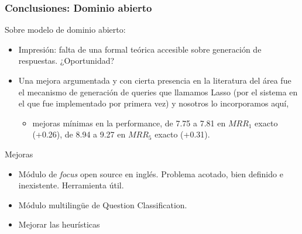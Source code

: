 \begin{frame}
\frametitle{Conclusiones: Dominio abierto}

Sobre modelo de dominio abierto:
  \begin{itemize}
 \item Impresión: falta de una  formal teórica accesible sobre generación de respuestas. ¿Oportunidad?
 \item Una mejora argumentada y con cierta presencia en la literatura del área fue el mecanismo de generación de queries que llamamos Lasso (por el sistema en el que fue implementado por primera vez) y nosotros lo incorporamos aquí, 
  \begin{itemize}
    \item  mejoras mínimas en la performance, de 7.75 a 7.81 en $MRR_1$ exacto (+0.26), de 8.94 a 9.27 en $MRR_5$ exacto (+0.31). 
  \end{itemize}
  \end{itemize}
Mejoras
 \begin{itemize}
  \item Módulo de \textit{focus} open source en inglés. Problema acotado, bien definido e inexistente. Herramienta útil.
  \item Módulo multilingüe de Question Classification.
  \item Mejorar las heurísticas
\end{itemize}

\end{frame}

